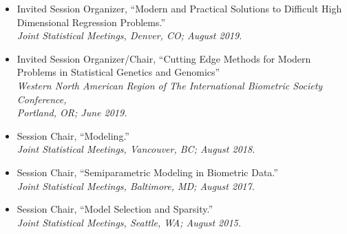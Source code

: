 \documentclass[11pt]{article}
\newcommand{\tab}{\hspace*{2em}}
\begin{document}
\begin{itemize}
	\item[] Invited Session Organizer, ``Modern and Practical Solutions to Difficult High Dimensional Regression Problems.'' \hfill   \\
	\tab \emph{Joint Statistical Meetings, Denver, CO; August 2019.}  \vspace{-2mm}
	\item[] Invited Session Organizer/Chair, ``Cutting Edge Methods for Modern Problems in Statistical Genetics and Genomics'' \hfill   \\
	\tab \emph{Western North American Region of The International Biometric Society Conference,} \\
	\tab \emph{Portland, OR; June 2019.}  \vspace{-2mm}
	\item[] Session Chair, ``Modeling.'' \hfill   \\
	\tab \emph{Joint Statistical Meetings, Vancouver, BC; August 2018.}  \vspace{-2mm}
	\item[] Session Chair, ``Semiparametric Modeling in Biometric Data.'' \hfill   \\
	\tab \emph{Joint Statistical Meetings, Baltimore, MD; August 2017.}  \vspace{-2mm}
	\item[] Session Chair, ``Model Selection and Sparsity.'' \hfill   \\
	\tab \emph{Joint Statistical Meetings, Seattle, WA; August 2015.}  \vspace{-2mm}
\end{itemize}
\end{document}
